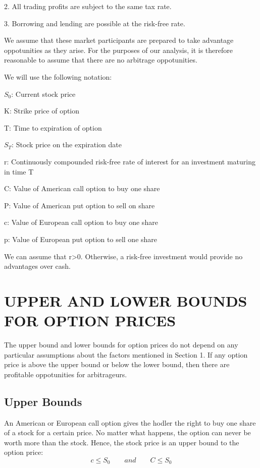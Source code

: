 \documentclass{article}
\begin{document}
2. All trading profits are subject to the same tax rate.

3. Borrowing and lending are possible at the risk-free rate.

\hspace*{\fill}

We assume that these market participants are prepared to take advantage oppotunities as they arise. For the purposes of our analysis, it is therefore reasonable to assume that there are no arbitrage oppotunities.

We will use the following notation:

$ S_0 $: Current stock price

K: Strike price of option

T: Time to expiration of option

$ S_T $: Stock price on the expiration date

r: Continuously compounded risk-free rate of interest for an investment maturing in time T

C: Value of American call option to buy one share

P: Value of American put option to sell on share

c: Value of European call option to buy one share

p: Value of European put option to sell one share

\hspace*{\fill}

We can assume that r>0. Otherwise, a risk-free investment would provide no advantages over cash.

\section{UPPER AND LOWER BOUNDS FOR OPTION PRICES}
The upper bound and lower bounds for option prices do not depend on any particular assumptions about the factors mentioned in Section 1. If any option price is above the upper bound or below the lower bound, then there are profitable oppotunities for arbitrageurs.

\subsection{Upper Bounds}
An American or European call option gives the hodler the right to buy one share of a stock for a certain price. No matter what happens, the option can never be worth more than the stock. Hence, the stock price is an upper bound to the option price:
\begin{equation}
	c\le S_0\qquad and\qquad C\le S_0
\end{equation}
\end{document}
